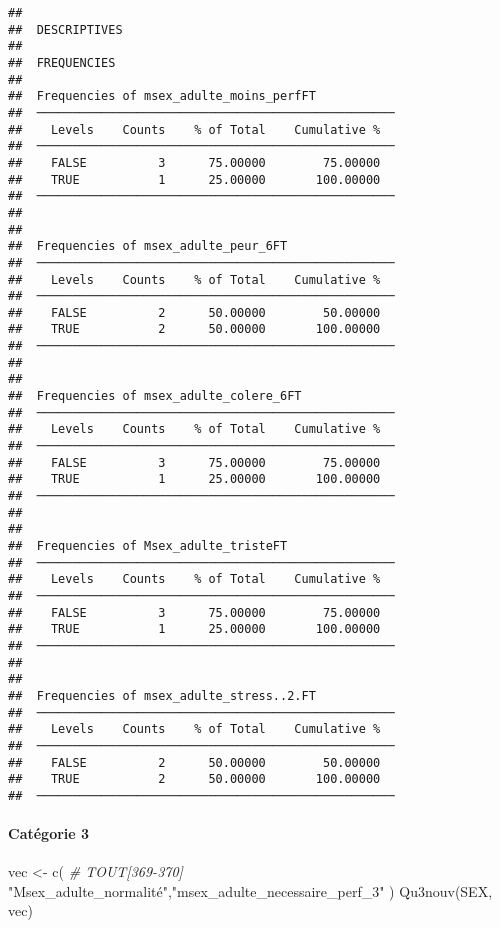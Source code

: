 \documentclass[
]{article}
\newenvironment{Shaded}{\begin{snugshade}}{\end{snugshade}}
\newcommand{\CommentTok}[1]{\textcolor[rgb]{0.56,0.35,0.01}{\textit{#1}}}
\newcommand{\FunctionTok}[1]{\textcolor[rgb]{0.00,0.00,0.00}{#1}}
\newcommand{\NormalTok}[1]{#1}
\newcommand{\OtherTok}[1]{\textcolor[rgb]{0.56,0.35,0.01}{#1}}
\newcommand{\StringTok}[1]{\textcolor[rgb]{0.31,0.60,0.02}{#1}}
\begin{document}
\begin{verbatim}
## 
##  DESCRIPTIVES
## 
##  FREQUENCIES
## 
##  Frequencies of msex_adulte_moins_perfFT            
##  ────────────────────────────────────────────────── 
##    Levels    Counts    % of Total    Cumulative %   
##  ────────────────────────────────────────────────── 
##    FALSE          3      75.00000        75.00000   
##    TRUE           1      25.00000       100.00000   
##  ────────────────────────────────────────────────── 
## 
## 
##  Frequencies of msex_adulte_peur_6FT                
##  ────────────────────────────────────────────────── 
##    Levels    Counts    % of Total    Cumulative %   
##  ────────────────────────────────────────────────── 
##    FALSE          2      50.00000        50.00000   
##    TRUE           2      50.00000       100.00000   
##  ────────────────────────────────────────────────── 
## 
## 
##  Frequencies of msex_adulte_colere_6FT              
##  ────────────────────────────────────────────────── 
##    Levels    Counts    % of Total    Cumulative %   
##  ────────────────────────────────────────────────── 
##    FALSE          3      75.00000        75.00000   
##    TRUE           1      25.00000       100.00000   
##  ────────────────────────────────────────────────── 
## 
## 
##  Frequencies of Msex_adulte_tristeFT                
##  ────────────────────────────────────────────────── 
##    Levels    Counts    % of Total    Cumulative %   
##  ────────────────────────────────────────────────── 
##    FALSE          3      75.00000        75.00000   
##    TRUE           1      25.00000       100.00000   
##  ────────────────────────────────────────────────── 
## 
## 
##  Frequencies of msex_adulte_stress..2.FT            
##  ────────────────────────────────────────────────── 
##    Levels    Counts    % of Total    Cumulative %   
##  ────────────────────────────────────────────────── 
##    FALSE          2      50.00000        50.00000   
##    TRUE           2      50.00000       100.00000   
##  ──────────────────────────────────────────────────
\end{verbatim}

\hypertarget{catuxe9gorie-3-4}{%
\paragraph{Catégorie 3}\label{catuxe9gorie-3-4}}

\begin{Shaded}
\begin{Highlighting}[]
\NormalTok{vec }\OtherTok{\textless{}{-}} \FunctionTok{c}\NormalTok{(  }\CommentTok{\# TOUT[369{-}370]}
  \StringTok{"Msex\_adulte\_normalité"}\NormalTok{,}\StringTok{"msex\_adulte\_necessaire\_perf\_3"}
\NormalTok{)}
\FunctionTok{Qu3nouv}\NormalTok{(SEX, vec)}
\end{Highlighting}
\end{Shaded}
\end{document}

